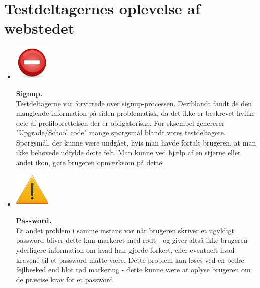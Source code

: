\documentclass[12pt]{article}
\begin{document}
\section{Testdeltagernes oplevelse af webstedet}
\begin{itemize}

  \item[]       \begin{minipage}{0.07\linewidth}
  \includegraphics[scale=0.4]{Billeder/kritisk}
          \end{minipage}
\textbf{Signup.}\\
   Testdeltagerne var forvirrede over signup-processen. Deriblandt fandt de den manglende information på siden problematisk, da det ikke er beskrevet hvilke dele af profiloprettelsen der er obligatoriske. For eksempel genererer "Upgrade/School code" mange spørgsmål blandt vores testdeltagere. Spørgsmål, der kunne være undgået, hvis man havde fortalt brugeren, at man ikke behøvede udfylde dette felt. Man kunne ved hjælp af en stjerne eller andet ikon, gøre brugeren opmærksom på dette.

  \item[]       \begin{minipage}{0.07\linewidth}
  \includegraphics[scale=0.4]{Billeder/alvorligt}
          \end{minipage}
 \textbf{Password.} \\Et andet problem i samme instans var når brugeren skriver et ugyldigt password bliver dette kun markeret med rødt - og giver altså ikke brugeren yderligere information om hvad han gjorde forkert, eller eventuelt hvad kravene til et password måtte være. Dette problem kan løses ved en bedre fejlbesked end blot rød markering - dette kunne være at oplyse brugeren om de præcise krav for et password.


\end{itemize}
\end{document}
